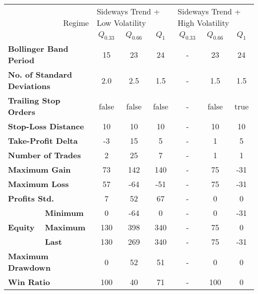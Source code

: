 \begin{tabular}{ll|cccccc}
    \toprule
    \multicolumn{2}{r|}{\multirow{2}{*}{Regime}} & \multicolumn{3}{l}{Sideways Trend + Low Volatility} & \multicolumn{3}{l}{Sideways Trend + High Volatility}  \\
    \multicolumn{2}{r|}{} & $Q_{0.33}$ & $Q_{0.66}$ & $Q_{1}$ & $Q_{0.33}$ & $Q_{0.66}$ & $Q_{1}$ \\
    \midrule
    \multicolumn{2}{l|}{\textbf{Bollinger Band Period}} & 15 & 23 & 24 & - & 23 & 24 \\
    \multicolumn{2}{l|}{\textbf{No. of Standard Deviations}} & 2.0 & 2.5 & 1.5 & - & 1.5 & 1.5 \\
    \multicolumn{2}{l|}{\textbf{Trailing Stop Orders}} & false & false & false & - & false & true \\
    \multicolumn{2}{l|}{\textbf{Stop-Loss Distance}} & 10 & 10 & 10 & - & 10 & 10 \\
    \multicolumn{2}{l|}{\textbf{Take-Profit Delta}} & -3 & 15 & 5 & - & 1 & 5 \\
    \midrule
    \multicolumn{2}{l|}{\textbf{Number of Trades}} & 2 & 25 & 7 & - & 1 & 1 \\
    \multicolumn{2}{l|}{\textbf{Maximum Gain}} & 73 & 142 & 140 & - & 75 & -31 \\
    \multicolumn{2}{l|}{\textbf{Maximum Loss}} & 57 & -64 & -51 & - & 75 & -31 \\
    \multicolumn{2}{l|}{\textbf{Profits Std.}} & 7 & 52 & 67 & - & 0 & 0 \\
    \multirow{3}{*}{\textbf{Equity}} & \textbf{Minimum} & 0   & -64 & 0   & - & 0  & -31 \\
    & \textbf{Maximum} & 130 & 398 & 340 & - & 75 & 0   \\
    & \textbf{Last}    & 130 & 269 & 340 & - & 75 & -31 \\
    \multicolumn{2}{l|}{\textbf{Maximum Drawdown}} & 0 & 52 & 51 & - & 0 & 0 \\
    \multicolumn{2}{l|}{\textbf{Win Ratio}} & 100 & 40 & 71 & - & 100 & 0 \\
    \bottomrule
\end{tabular}